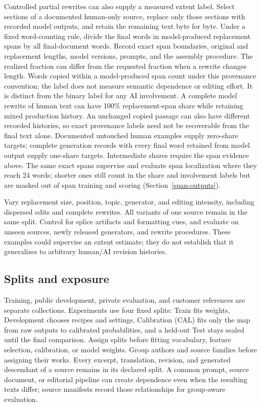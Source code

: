 Controlled partial rewrites can also supply a measured extent label. Select
sections of a documented human-only source, replace only those sections with
recorded model outputs, and retain the remaining text byte for byte. Under a
fixed word-counting rule, divide the final words in model-produced replacement
spans by all final-document words. Record exact span boundaries, original and
replacement lengths, model versions, prompts, and the assembly procedure.
The realized fraction can differ from the requested fraction when a rewrite
changes length. Words copied within a model-produced span count under this
provenance convention; the label does not measure semantic dependence or
editing effort. It is distinct from the binary label for any AI involvement.
A complete model rewrite of human text can have 100\% replacement-span share
while retaining mixed production history. An unchanged copied passage can
also have different recorded histories, so exact provenance labels need not
be recoverable from the final text alone.
Documented untouched human examples supply zero-share targets; complete
generation records with every final word retained from model output supply
one-share targets. Intermediate shares require the span evidence above. The
same exact spans supervise and evaluate span localization where they reach 24
words; shorter ones still count in the share and involvement labels but are
masked out of span training and scoring (Section~\ref{span-outputs}).

Vary replacement size, position, topic, generator, and editing intensity,
including dispersed edits and complete rewrites. All variants of one source
remain in the same split. Control for splice artifacts and formatting cues,
and evaluate on unseen sources, newly released generators, and rewrite
procedures. These
examples could supervise an extent estimate; they do not establish that it
generalizes to arbitrary human/AI revision histories.

\subsection{Splits and exposure}\label{splits}

Training, public development, private evaluation, and customer references are
separate collections. Experiments use four fixed splits: Train fits weights,
Development chooses recipes and settings, Calibration (CAL) fits only the map
from raw outputs to calibrated probabilities, and a held-out Test stays sealed
until the final comparison. Assign splits before fitting vocabulary, feature
selection, calibration, or model weights. Group authors and source families
before assigning their works. Every excerpt, translation, revision, and
generated descendant of a source remains in its declared split. A common
prompt, source document, or editorial pipeline can create dependence even
when the resulting texts differ; source manifests record those relationships
for group-aware evaluation.

